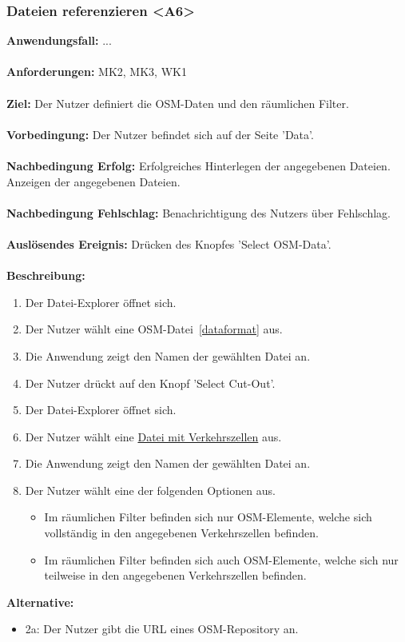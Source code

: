 \documentclass[parskip=full]{scrartcl} %
\begin{document}
\subsubsection*{Dateien referenzieren <A6>}
\textbf{Anwendungsfall:} ...\\\\
\textbf{Anforderungen:} MK2, MK3, WK1 \\\\
\textbf{Ziel:} Der Nutzer definiert die OSM-Daten und den räumlichen Filter.\\\\
\textbf{Vorbedingung:} Der Nutzer befindet sich auf der Seite 'Data'. \\\\
\textbf{Nachbedingung Erfolg:} Erfolgreiches Hinterlegen der angegebenen Dateien. Anzeigen der angegebenen Dateien.\\\\
\textbf{Nachbedingung Fehlschlag:} Benachrichtigung des Nutzers über Fehlschlag. \\\\
\textbf{Auslösendes Ereignis:} Drücken des Knopfes 'Select OSM-Data'.\\\\
\textbf{Beschreibung:}
\begin{enumerate}
    \item Der Datei-Explorer öffnet sich.
    \item Der Nutzer wählt eine {OSM-Datei}~\ref{dataformat} aus.
    \item Die Anwendung zeigt den Namen der gewählten Datei an.
    \item Der Nutzer drückt auf den Knopf 'Select Cut-Out'.
    \item Der Datei-Explorer öffnet sich.
    \item Der Nutzer wählt eine \hyperlink{dataformat}{Datei mit Verkehrszellen} aus.
    \item Die Anwendung zeigt den Namen der gewählten Datei an.
    \item Der Nutzer wählt eine der folgenden Optionen aus.
    \begin{itemize}
        \item Im räumlichen Filter befinden sich nur OSM-Elemente, welche sich vollständig in den angegebenen Verkehrszellen befinden.
        \item Im räumlichen Filter befinden sich auch OSM-Elemente, welche sich nur teilweise in den angegebenen Verkehrszellen befinden.
    \end{itemize}
\end{enumerate}
\textbf{Alternative:}
\begin{itemize}
    \item 2a: Der Nutzer gibt die URL eines OSM-Repository an.
\end{itemize}
\newpage
\end{document}
